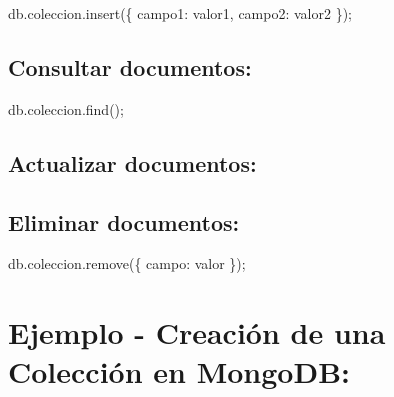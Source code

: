 \documentclass[
  a4paper,
  DIV=11,
  numbers=noendperiod,
  onepage,
  openany]{scrreprt}
\newenvironment{Shaded}{\begin{snugshade}}{\end{snugshade}}
\newcommand{\NormalTok}[1]{\textcolor[rgb]{0.00,0.23,0.31}{#1}}
\begin{document}
\begin{Shaded}
\begin{Highlighting}[]
\NormalTok{db.coleccion.insert(\{ campo1: valor1, campo2: valor2 \});}
\end{Highlighting}
\end{Shaded}

\hypertarget{consultar-documentos}{%
\subsection{Consultar documentos:}\label{consultar-documentos}}

\begin{Shaded}
\begin{Highlighting}[]
\NormalTok{db.coleccion.find();}
\end{Highlighting}
\end{Shaded}

\hypertarget{actualizar-documentos}{%
\subsection{Actualizar documentos:}\label{actualizar-documentos}}

\begin{Shaded}
\end{Shaded}

\hypertarget{eliminar-documentos}{%
\subsection{Eliminar documentos:}\label{eliminar-documentos}}

\begin{Shaded}
\begin{Highlighting}[]
\NormalTok{db.coleccion.remove(\{ campo: valor \});}
\end{Highlighting}
\end{Shaded}

\hypertarget{ejemplo---creaciuxf3n-de-una-colecciuxf3n-en-mongodb}{%
\section{Ejemplo - Creación de una Colección en
MongoDB:}\label{ejemplo---creaciuxf3n-de-una-colecciuxf3n-en-mongodb}}
\end{document}
